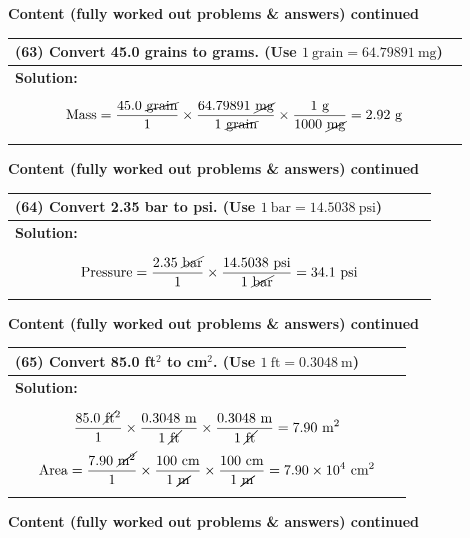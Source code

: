 \documentclass{article}
\begin{document}
\newpage
\noindent
{\large \textbf{Content (fully worked out problems \& answers) continued}} \\[0.2em]
\begin{tabular}{|p{0.9\linewidth}|}
\hline
\vspace{0.2cm}

\textbf{(63)} Convert 45.0 grains to grams. (Use $1~\text{grain}=64.79891~\text{mg}$) \\
\hline
\textbf{Solution:} \\
\[
\text{Mass} = \frac{45.0~\cancel{\text{grain}}}{1} \times \frac{64.79891~\cancel{\text{mg}}}{1~\cancel{\text{grain}}} \times \frac{1~\text{g}}{1000~\cancel{\text{mg}}} = 2.92~\text{g}
\]
\\
\hline
\end{tabular}
\newpage
\noindent
{\large \textbf{Content (fully worked out problems \& answers) continued}} \\[0.2em]
\begin{tabular}{|p{0.9\linewidth}|}
\hline
\vspace{0.2cm}

\textbf{(64)} Convert 2.35 bar to psi. (Use $1~\text{bar}=14.5038~\text{psi}$) \\
\hline
\textbf{Solution:} \\
\[
\text{Pressure} = \frac{2.35~\cancel{\text{bar}}}{1} \times \frac{14.5038~\text{psi}}{1~\cancel{\text{bar}}} = 34.1~\text{psi}
\]
\\
\hline
\end{tabular}
\newpage
\noindent
{\large \textbf{Content (fully worked out problems \& answers) continued}} \\[0.2em]
\begin{tabular}{|p{0.9\linewidth}|}
\hline
\vspace{0.2cm}

\textbf{(65)} Convert 85.0 ft$^2$ to cm$^2$. (Use $1~\text{ft}=0.3048~\text{m}$) \\
\hline
\textbf{Solution:} \\
\[
\frac{85.0~\cancel{\text{ft}}^2}{1} \times \frac{0.3048~\text{m}}{1~\cancel{\text{ft}}} \times \frac{0.3048~\text{m}}{1~\cancel{\text{ft}}} = 7.90~\text{m}^2
\]
\[
\text{Area} = \frac{7.90~\cancel{\text{m}^2}}{1} \times \frac{100~\text{cm}}{1~\cancel{\text{m}}} \times \frac{100~\text{cm}}{1~\cancel{\text{m}}} = 7.90 \times 10^4~\text{cm}^2
\]
\\
\hline
\end{tabular}
\newpage
\noindent
{\large \textbf{Content (fully worked out problems \& answers) continued}} \\[0.2em]
\end{document}
